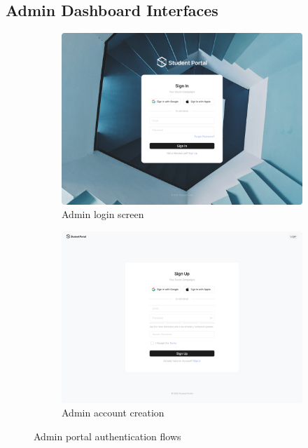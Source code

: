 \subsection{Admin Dashboard Interfaces}
\begin{figure}[H]
    \centering
    \begin{subfigure}{0.45\textwidth}
        \includegraphics[width=\textwidth]{images/web_interface/Authentication-Sign_In.jpg}
        \caption{Admin login screen}
        \label{fig:admin_login}
    \end{subfigure}
    \begin{subfigure}{0.45\textwidth}
        \includegraphics[width=\textwidth]{images/web_interface/Authentication-Sign_Up.jpg}
        \caption{Admin account creation}
        \label{fig:admin_signup}
    \end{subfigure}
    \caption{Admin portal authentication flows}
    \label{fig:admin_auth}
\end{figure}

